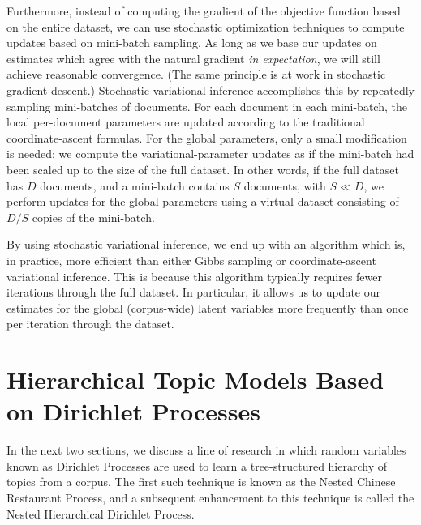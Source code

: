 \documentclass{article}
\begin{document}
Furthermore, instead of computing the gradient of the objective function based on the entire dataset, we can use stochastic optimization techniques to compute updates based on mini-batch sampling.
As long as we base our updates on estimates which agree with the natural gradient \emph{in expectation}, we will still achieve reasonable convergence.
(The same principle is at work in stochastic gradient descent.)
Stochastic variational inference accomplishes this by repeatedly sampling mini-batches of documents.
For each document in each mini-batch, the local per-document parameters are updated according to the traditional coordinate-ascent formulas.
For the global parameters, only a small modification is needed: we compute the variational-parameter updates as if the mini-batch had been scaled up to the size of the full dataset.
In other words, if the full dataset has $D$ documents, and a mini-batch contains $S$ documents, with $S \ll D$, we perform updates for the global parameters using a virtual dataset consisting of $D / S$ copies of the mini-batch.


By using stochastic variational inference, we end up with an algorithm which is, in practice, more efficient than either Gibbs sampling or coordinate-ascent variational inference.
This is because this algorithm typically requires fewer iterations through the full dataset.
In particular, it allows us to update our estimates for the global (corpus-wide) latent variables more frequently than once per iteration through the dataset.


\section{Hierarchical Topic Models Based on Dirichlet Processes}

In the next two sections, we discuss a line of research in which random variables known as Dirichlet Processes are used to learn a tree-structured hierarchy of topics from a corpus.
The first such technique is known as the Nested Chinese Restaurant Process, and a subsequent enhancement to this technique is called the Nested Hierarchical Dirichlet Process.
\end{document}
